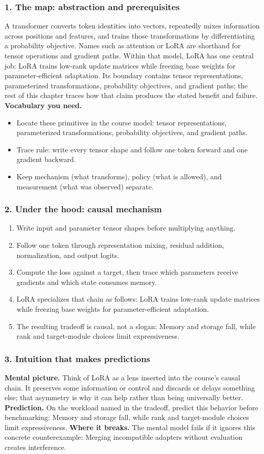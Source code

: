 \subsubsection*{1. The map: abstraction and prerequisites}
A transformer converts token identities into vectors, repeatedly mixes information across positions and features, and trains those transformations by differentiating a probability objective. Names such as attention or LoRA are shorthand for tensor operations and gradient paths.
Within that model, LoRA has one central job: LoRA trains low-rank update matrices while freezing base weights for parameter-efficient adaptation. Its boundary contains tensor representations, parameterized transformations, probability objectives, and gradient paths; the rest of this chapter traces how that claim produces the stated benefit and failure.
\textbf{Vocabulary you need.}\begin{itemize}
\item Locate these primitives in the course model: tensor representations, parameterized transformations, probability objectives, and gradient paths.
\item Trace rule: write every tensor shape and follow one token forward and one gradient backward.
\item Keep mechanism (what transforms), policy (what is allowed), and measurement (what was observed) separate.
\end{itemize}
\subsubsection*{2. Under the hood: causal mechanism}\begin{enumerate}
\item Write input and parameter tensor shapes before multiplying anything.
\item Follow one token through representation mixing, residual addition, normalization, and output logits.
\item Compute the loss against a target, then trace which parameters receive gradients and which state consumes memory.
\item LoRA specializes that chain as follows: LoRA trains low-rank update matrices while freezing base weights for parameter-efficient adaptation.
\item The resulting tradeoff is causal, not a slogan: Memory and storage fall, while rank and target-module choices limit expressiveness.
\end{enumerate}
\subsubsection*{3. Intuition that makes predictions}
\textbf{Mental picture.} Think of LoRA as a lens inserted into the course's causal chain. It preserves some information or control and discards or delays something else; that asymmetry is why it can help rather than being universally better.
\textbf{Prediction.} On the workload named in the tradeoff, predict this behavior before benchmarking: Memory and storage fall, while rank and target-module choices limit expressiveness.
\textbf{Where it breaks.} The mental model fails if it ignores this concrete counterexample: Merging incompatible adapters without evaluation creates interference.
